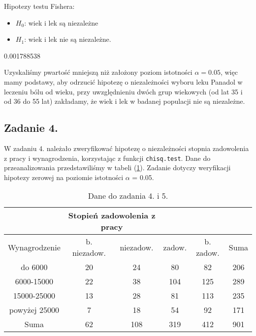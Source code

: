 \documentclass[12pt]{mwart}
\begin{document}
Hipotezy testu Fishera:
\begin{itemize}[label=$\bullet$]
	\item $H_0$: wiek i lek są niezależne
	\item $H_1$: wiek i lek nie są niezależne.
\end{itemize}

\begin{Schunk}
\begin{Soutput}
[1] 0.001788538
\end{Soutput}
\end{Schunk}

Uzyskaliśmy p{\dywiz}wartość mniejszą niż założony poziom istotności $$, więc mamy podstawy, aby odrzucić hipotezę o niezależności wyboru leku Panadol w leczeniu bólu od wieku, przy uwzględnieniu dwóch grup wiekowych (od lat 35 i od 36 do 55 lat) \pauza zakładamy, że wiek i lek w badanej populacji nie są niezależne.

\subsection{Zadanie 4.}

W zadaniu 4. należało zweryfikować hipotezę o niezależności stopnia zadowolenia z pracy i wynagrodzenia, korzystając z funkcji \verb|chisq.test|. Dane do przeanalizowania przedstawiliśmy w tabeli (\ref{tab:tabela2}). Zadanie dotyczy weryfikacji hipotezy zerowej na poziomie istotności $\alpha$ = 0.05. 

\begin{table}[h!]
	\begin{center}
		\begin{tabular}{cccccc}
			\hline
			& \multicolumn{2}{c}{Stopień zadowolenia z pracy} & & \\\hline
			Wynagrodzenie & b. niezadow. & niezadow. & zadow. & b. zadow. & Suma \\\hline
			do 6000 & 20 & 24 & 80 & 82 & 206 \\
			6000-15000 & 22 & 38 & 104 & 125 & 289 \\
			15000-25000 & 13 & 28 & 81 & 113 & 235 \\
			powyżej 25000 & 7 & 18 & 54 & 92 & 171 \\\hline
			Suma & 62 & 108 & 319 & 412 & 901 \\\hline
		\end{tabular}
	\end{center}
	\caption{Dane do zadania 4. i 5.}
	\label{tab:tabela2}
\end{table}
\end{document}
